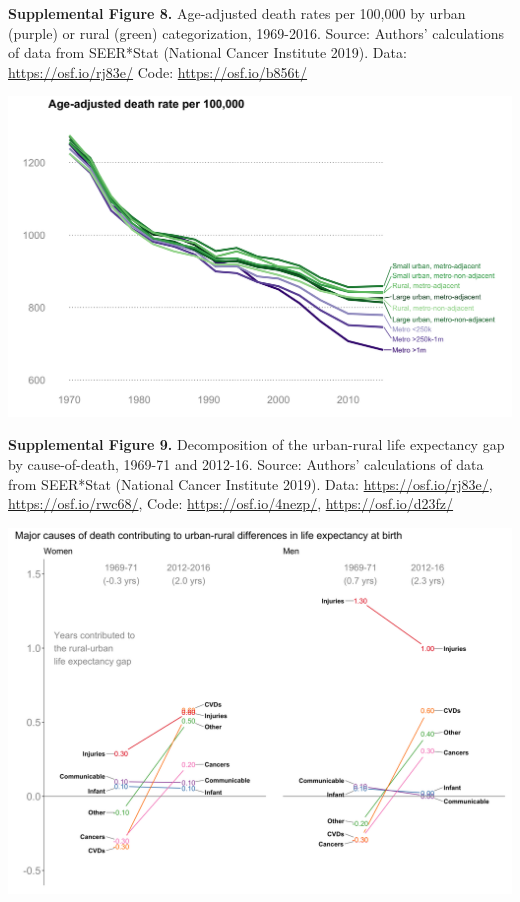 \documentclass[
  11pt,
]{article}
\begin{document}
\newpage

\textbf{Supplemental Figure 8.} Age-adjusted death rates per 100,000 by
urban (purple) or rural (green) categorization, 1969-2016. Source:
Authors' calculations of data from SEER*Stat (National Cancer Institute
2019). Data: \url{https://osf.io/rj83e/} Code:
\url{https://osf.io/b856t/}

\includegraphics[width=1\linewidth]{../figures/rural-aadr-trends}

\newpage

\textbf{Supplemental Figure 9.} Decomposition of the urban-rural life
expectancy gap by cause-of-death, 1969-71 and 2012-16. Source: Authors'
calculations of data from SEER*Stat (National Cancer Institute 2019).
Data: \url{https://osf.io/rj83e/}, \url{https://osf.io/rwc68/}, Code:
\url{https://osf.io/4nezp/}, \url{https://osf.io/d23fz/}

\includegraphics[width=1\linewidth]{../figures/ur-decomp-plot}
\end{document}
